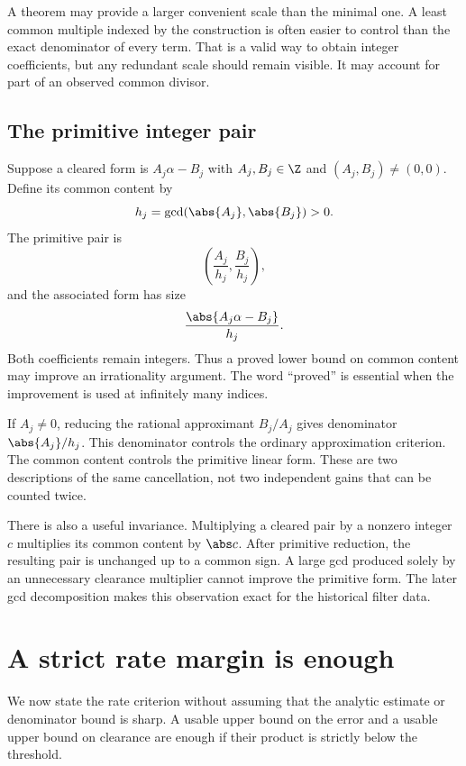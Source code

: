 A theorem may provide a larger convenient scale than the minimal one. A least common multiple indexed by the construction is often easier to control than the exact denominator of every term. That is a valid way to obtain integer coefficients, but any redundant scale should remain visible. It may account for part of an observed common divisor.

\subsection{The primitive integer pair}

Suppose a cleared form is $A_j\alpha-B_j$ with $A_j,B_j\in\Z$ and $(A_j,B_j)\ne(0,0)$. Define its common content by
\begin{equation}
h_j=\gcd(\abs{A_j},\abs{B_j})>0.
\label{eq:c02-content}
\end{equation}
The primitive pair is
\[
\left(\frac{A_j}{h_j},\frac{B_j}{h_j}\right),
\]
and the associated form has size
\begin{equation}
\frac{\abs{A_j\alpha-B_j}}{h_j}.
\label{eq:c02-primitive-form}
\end{equation}
Both coefficients remain integers. Thus a proved lower bound on common content may improve an irrationality argument. The word ``proved'' is essential when the improvement is used at infinitely many indices.

If $A_j\ne0$, reducing the rational approximant $B_j/A_j$ gives denominator $\abs{A_j}/h_j$. This denominator controls the ordinary approximation criterion. The common content controls the primitive linear form. These are two descriptions of the same cancellation, not two independent gains that can be counted twice.

There is also a useful invariance. Multiplying a cleared pair by a nonzero integer $c$ multiplies its common content by $\abs c$. After primitive reduction, the resulting pair is unchanged up to a common sign. A large gcd produced solely by an unnecessary clearance multiplier cannot improve the primitive form. The later gcd decomposition makes this observation exact for the historical filter data.

\section{A strict rate margin is enough}

We now state the rate criterion without assuming that the analytic estimate or denominator bound is sharp. A usable upper bound on the error and a usable upper bound on clearance are enough if their product is strictly below the threshold.


